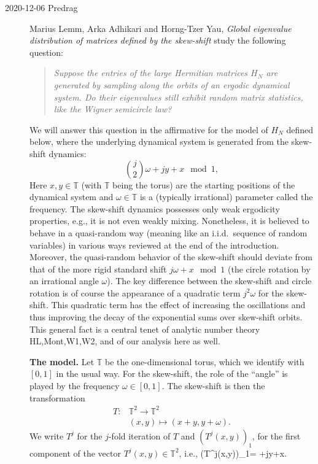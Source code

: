 \begin{description}
\item[2020-12-06 Predrag]
Marius Lemm, Arka Adhikari and Horng-Tzer Yau, %
{\em Global eigenvalue distribution of matrices defined by the skew-shift}
 study the following question:

\begin{quote}
\emph{Suppose the entries of the large Hermitian matrices $H_N$ are
generated by sampling along the orbits of an ergodic dynamical system. Do
their eigenvalues  still exhibit random matrix statistics, like the
Wigner semicircle law?}
\end{quote}

We will answer this question in the affirmative for the model of $H_N$
defined below, where the underlying dynamical system is generated from
the skew-shift dynamics:
$$
\binom{j}{2} \omega+jy+x \mod 1,
$$
Here $x,y\in \mathbb{T}$ (with $\mathbb{T}$ being the torus) are the
starting positions of the dynamical system and $\omega\in \mathbb{T}$ is
a (typically irrational) parameter called the frequency. The skew-shift
dynamics possesses only weak ergodicity properties, e.g., it is not even
weakly mixing. Nonetheless, it is believed to behave in a quasi-random
way (meaning like an i.i.d.\ sequence of random variables) in various
ways reviewed at the end of the introduction. Moreover, the quasi-random
behavior of the skew-shift should deviate from that of the more rigid
standard shift $j\omega+x\mod 1$ (the circle rotation by an irrational
angle $\omega$). The key difference between the skew-shift and circle
rotation is of course the appearance of a quadratic term $j^2\omega$ for the
skew-shift. This quadratic term has the effect of increasing the
oscillations and thus improving the decay of the exponential sums over
skew-shift orbits. This general fact is a central tenet of analytic
number theory {HL,Mont,W1,W2}, and of our analysis here as well.

{\bf The model.}
Let $\mathbb T$ be the one-dimensional torus, which we identify with
$[0,1]$ in the usual way. For the skew-shift, the role of the ``angle''
is played by the frequency $\omega \in[0,1]$. The skew-shift is then the
transformation
$$
\begin{aligned}
T:&\mathbb{T}^2\to\mathbb{T}^2\\
&(x,y)\mapsto (x+y,y+\omega).
\end{aligned}
$$
We write $T^j$ for the $j$-fold iteration of $T$ and $(T^j(x,y))_1$, for
the first component of the vector $T^j(x,y)\in\mathbb{T}^2$, i.e.,
\beq\label{LeAdYa19:Tjformula}
(T^j(x,y))_1= \omega+jy+x.
\eeq


\end{description}
